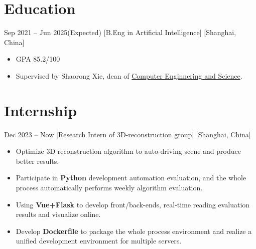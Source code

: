 \documentclass{chicv}
\begin{document}
\begin{basicinfo}
\end{basicinfo}


\section{Education}
  {Sep 2021 -- Jun 2025(Expected)}
  [B.Eng in Artificial Intelligence]
  [Shanghai, China]
  \begin{itemize}
    \item GPA 85.2/100
    \item Supervised by Shaorong Xie, dean of \href{https://cs.shu.edu.cn/}{Computer Enginnering and Science}.
  \end{itemize}



\section{Internship}
{Dec 2023 -- Now}
  [Research Intern of 3D-reconstruction group]
  [Shanghai, China]
  \begin{itemize}
    \item Optimize 3D reconstruction algorithm to auto-driving scene and produce better results.
    \item Participate in \textbf{Python} development automation evaluation, and the whole process automatically performs weekly algorithm evaluation.
    \item Using \textbf{Vue+Flask} to develop front/back-ends, real-time reading evaluation results and visualize online.
    \item Develop \textbf{Dockerfile} to package the whole process environment and realize a unified development environment for multiple servers.
  \end{itemize}
\end{document}
